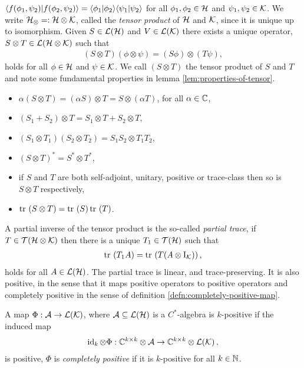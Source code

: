 $\langle f(\phi_1,\psi_2)|f(\phi_2,\psi_2)\rangle = \langle \phi_1|\phi_2\rangle\langle \psi_1|\psi_2\rangle$ for all $\phi_1,\phi_2\in\mathcal{H}$ and $\psi_1,\psi_2\in\mathcal{K}$. We write $\mathcal{H}_\otimes =: \mathcal{H}\otimes\mathcal{K}$, called the \emph{tensor product} of $\mathcal{H}$ and $\mathcal{K}$, since it is unique up to isomorphism. Given $S\in\bops[\hcal]$ and $V\in\bops[\kcal]$ there exists a unique operator, $S\otimes T\in\bops[\hcal\otimes\kcal]$ such that 
\begin{align}
  (S\otimes T)(\phi\otimes\psi) = (S\phi)\otimes(T\psi),
\end{align}
holds for all $\phi\in\mathcal{H}$ and $\psi\in\mathcal{K}$. We call  $(S\otimes T)$ the tensor product of $S$ and $T$ and note some fundamental properties in lemma \ref{lem:properties-of-tensor}.
\begin{lem}\label{lem:properties-of-tensor}\leavevmode
\begin{itemize}
  \item $\alpha(S\otimes T) = (\alpha S)\otimes T = S\otimes(\alpha T)$, for all $\alpha\in\mathbb{C}$,
  \item $(S_1 + S_2)\otimes T = S_1\otimes T + S_2 \otimes T$,
  \item $(S_1\otimes T_1)(S_2\otimes T_2) = S_1S_2 \otimes T_1 T_2$,
  \item $(S\otimes T)^* = S^*\otimes T^*$,
  \item if $S$ and $T$ are both self-adjoint, unitary, positive or trace-class then so is $S\otimes T$ respectively,
  \item $\tr{S\otimes T} = \tr{S}\tr{T}$.
\end{itemize}
\end{lem}
A partial inverse of the tensor product is the so-called \emph{partial trace}, if $T\in\trops[\hcal\otimes\kcal]$ then there is a unique $T_1\in\trops[\hcal]$ such that
\begin{align}
  \tr{T_1 A} = \tr{T(A\otimes \opi_\kcal)},
\end{align}
holds for all $A\in \bops[\hcal]$. The partial trace is linear, and trace-preserving. It is also positive, in the sense that it maps positive operators to positive operators and completely positive in the sense of definition \ref{defn:completely-positive-map}.

\begin{defn}\label{defn:completely-positive-map}
  A map $\Phi:\acal\to \bops[\kcal]$, where $\acal\subseteq \bops[\hcal]$ is a $C^*$-algebra is $k$-positive if the induced map
  \begin{align}
    \operatorname{id}_k\otimes \Phi:\Cx^{k\times k}\otimes \acal\to \Cx^{k\times k}\otimes\bops[\kcal],
  \end{align}
  is positive, $\Phi$ is \emph{completely positive} if it is $k$-positive for all $k\in\mathbb{N}$.
\end{defn}

